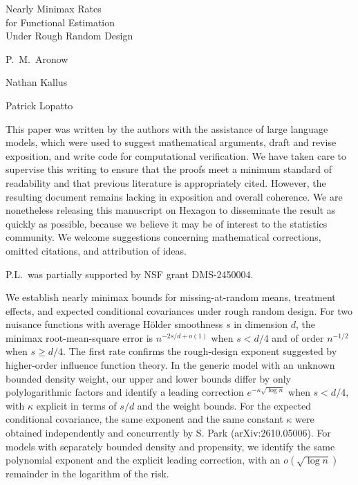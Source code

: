 \documentclass[12pt,oneside,openany]{book}
\numberwithin{equation}{chapter}
\theoremstyle{plain}
\theoremstyle{definition}
\theoremstyle{remark}
\newcommand{\npptitlepage}[2]{%
  \hypersetup{pageanchor=false}%
  \begin{titlepage}
  \centering\normalfont
  \vspace*{1.7in}
  {\large\strut\par}
  \vspace{1.05in}
  {\fontsize{28}{35}\selectfont #1\par}
  \vspace{1.1in}
  {\Large\def\\{\par\vspace{10pt}}#2\par}
  \vfill
  \end{titlepage}%
  \hypersetup{pageanchor=true}}
\begin{document}
\frontmatter
\npptitlepage{Nearly Minimax Rates\\ for Functional Estimation\\ Under Rough Random Design}{P.\ M.\ Aronow\\ Nathan Kallus\\ Patrick Lopatto}
\begin{authorsnote}
This paper was written by the authors with the assistance of large language
models, which were used to suggest mathematical arguments, draft and revise
exposition, and write code for computational verification. We have taken care
to supervise this writing to ensure that the proofs meet a minimum standard of
readability and that previous literature is appropriately cited. However, the
resulting document remains lacking in exposition and overall coherence. We are
nonetheless releasing this manuscript on Hexagon to disseminate the result as
quickly as possible, because we believe it may be of interest to the statistics
community. We welcome suggestions concerning mathematical corrections, omitted
citations, and attribution of ideas.

P.L.\ was partially supported by NSF grant DMS-2450004.
\end{authorsnote}
\begin{abstractpage}
We establish nearly minimax bounds for missing-at-random means,
treatment effects, and expected conditional covariances under rough
random design.
For two nuisance functions with average H\"older smoothness
$s$ in dimension $d$, the minimax root-mean-square error is
$n^{-2s/d+o(1)}$ when $s<d/4$ and of order $n^{-1/2}$ when $s\ge d/4$.
The first rate confirms the rough-design exponent suggested by
higher-order influence function theory. In the generic model with an
unknown bounded density weight, our upper and lower bounds differ by
only polylogarithmic factors and identify a leading correction
$e^{-\kappa\sqrt{\log n}}$ when $s<d/4$, with $\kappa$ explicit in terms
of $s/d$ and the weight bounds. For the expected conditional covariance,
the same exponent and the same constant $\kappa$ were obtained
independently and concurrently by S. Park (arXiv:2610.05006). For models with separately bounded
density and propensity, we identify the same polynomial exponent and
the explicit leading correction, with an $o(\sqrt{\log n})$ remainder
in the logarithm of the risk.
\end{abstractpage}
\tableofcontents
\mainmatter

\backmatter
\setlength{\bibsep}{3pt plus 1pt minus 1pt}
\end{document}
